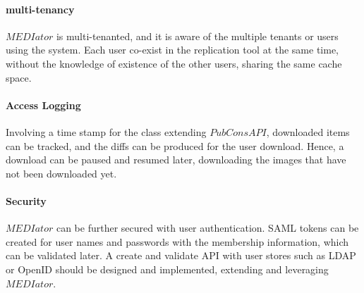 \documentclass[conference]{IEEEtran}
\begin{document}
\paragraph*{multi-tenancy}
$MEDIator$ is multi-tenanted, and it is aware of the multiple tenants or users using the system. Each user co-exist in the replication tool at the same time, without the knowledge of existence of the other users, sharing the same cache space. 

\paragraph*{Access Logging}
Involving a time stamp for the class extending $PubConsAPI$, downloaded items can be tracked, and the diffs can be produced for the user download. Hence, a download can be paused and resumed later, downloading the images that have not been downloaded yet.

\paragraph*{Security}
$MEDIator$ can be further secured with user authentication. SAML tokens can be created for user names and passwords with the membership information, which can be validated later. A create and validate API with user stores such as LDAP or OpenID should be designed and implemented, extending and leveraging $MEDIator$.
\end{document}
